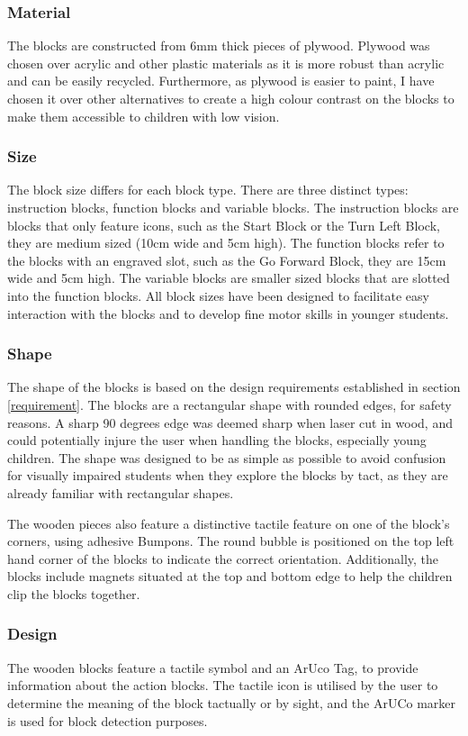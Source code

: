 \documentclass[oneside,%
                    author={Malak Hajji},
                    degree={BSc},
                    title={Designing An Accessible Ozobot Programming Platform for Students},
                  subtitle={With Mixed Visual Abilities}]{dissertation}
\begin{document}
\subsubsection{Material}
The blocks are constructed from 6mm thick pieces of plywood. Plywood was chosen over acrylic and other plastic materials as it is more robust than acrylic and can be easily recycled. Furthermore, as plywood is easier to paint, I have chosen it over other alternatives to create a high colour contrast on the blocks to make them accessible to children with low vision.
\subsubsection{Size}
The block size differs for each block type. There are three distinct types: instruction blocks, function blocks and variable blocks. The instruction blocks are blocks that only feature icons, such as the Start Block or the Turn Left Block, they are medium sized (10cm wide and 5cm high). The function blocks refer to the blocks with an engraved slot, such as the Go Forward Block, they are 15cm wide and 5cm high. The variable blocks are smaller sized blocks that are slotted into the function blocks. All block sizes have been designed to facilitate easy interaction with the blocks and to develop fine motor skills in younger students.
\subsubsection{Shape}
The shape of the blocks is based on the design requirements established in section \ref{requirement}. The blocks are a rectangular shape with rounded edges, for safety reasons. A sharp 90 degrees edge was deemed sharp when laser cut in wood, and could potentially injure the user when handling the blocks, especially young children. The shape was designed to be as simple as possible to avoid confusion for visually impaired students when they explore the blocks by tact, as they are already familiar with rectangular shapes. 

The wooden pieces also feature a distinctive tactile feature on one of the block’s corners, using adhesive Bumpons. The round bubble is positioned on the top left hand corner of the blocks to indicate the correct orientation. Additionally, the blocks include magnets situated at the top and bottom edge to help the children clip the blocks together.

\subsubsection{Design}
The wooden blocks feature a tactile symbol and an ArUco Tag, to provide information about the action blocks. The tactile icon is utilised by the user to determine the meaning of the block tactually or by sight, and the ArUCo marker is used for block detection purposes. 
\end{document}
